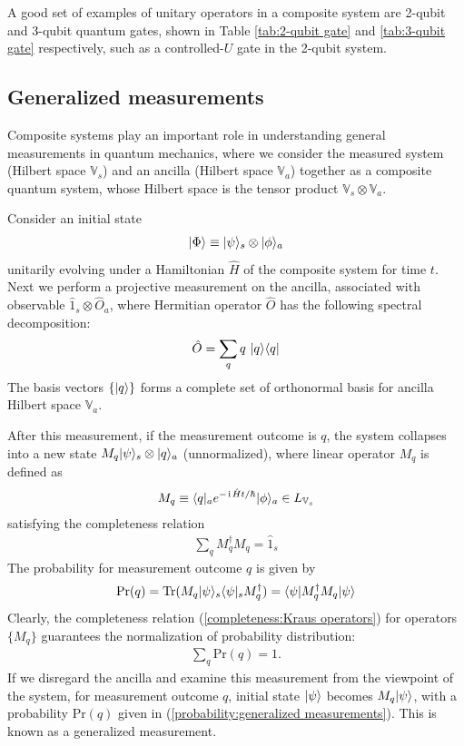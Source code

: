 A good set of examples of unitary operators in a composite system are 2-qubit and 3-qubit quantum gates, shown in Table \ref{tab:2-qubit gate} and \ref{tab:3-qubit gate} respectively, such as a controlled-$U$ gate in the 2-qubit system.

\subsection{Generalized measurements}\label{sec:generalized measurements}

Composite systems play an important role in understanding general measurements in quantum mechanics, where we consider the measured system (Hilbert space $\mathbb{V}_s$) and an ancilla (Hilbert space $\mathbb{V}_a$) together as a composite quantum system, whose Hilbert space is the tensor product $\mathbb{V}_s\otimes\mathbb{V}_a$.

Consider an initial state 
\begin{align}
    |{\Phi}\rangle\equiv|{\psi}\rangle_s\otimes|{\phi}\rangle_a
\end{align}
unitarily evolving under a Hamiltonian $\hat H$ of the composite system for time $t$. Next we perform a projective measurement on the ancilla, associated with observable $\hat1_s\otimes\hat O_a$, where Hermitian operator $\hat O$ has the following spectral decomposition:
\begin{align}
    \hat O=\sum_q q~|{q}\rangle\langle{q}|
\end{align}
The basis vectors $\{|{q}\rangle\}$ forms a complete set of orthonormal basis for ancilla Hilbert space $\mathbb{V}_a$.

After this measurement, if the measurement outcome is $q$, the system collapses into a new state $M_q|{\psi}\rangle_s\otimes|{q}\rangle_a$ (unnormalized), where linear operator $M_q$ is defined as
\begin{align}\label{Kraus operators:generalized measurements}
    M_q\equiv \langle{q|_a e^{-\hspace{1pt}\mathrm{i}\hspace{1pt}\hat Ht/\hbar}|\phi}\rangle_a\in L_{\mathbb{V}_s}
\end{align}
satisfying the completeness relation
\begin{align}\label{completeness:Kraus operators}
    \sum_qM_q^\dagger M_q=\hat 1_s
\end{align}
The probability for measurement outcome $q$ is given by
\begin{align}\label{probability:generalized measurements}
    \text{Pr}(q)=\text{Tr}(M_q|{\psi}\rangle_s\langle{\psi}|_sM_q^\dagger)=\langle{\psi|M_q^\dagger M_q|\psi}\rangle
\end{align}
Clearly, the completeness relation (\ref{completeness:Kraus operators}) for operators $\{M_q\}$ guarantees the normalization of probability distribution:
\begin{align}
    \sum_q\text{Pr}(q)=1.
\end{align}
If we disregard the ancilla and examine this measurement from the viewpoint of the system, for measurement outcome $q$, initial state $|{\psi}\rangle$ becomes $M_q|{\psi}\rangle$, with a probability $\text{Pr}(q)$ given in (\ref{probability:generalized measurements}). This is known as a generalized measurement. 


